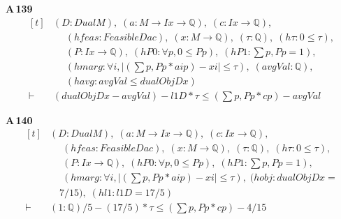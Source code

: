 \noindent\textbf{A\,139}\quad{}
{\footnotesize\[ \begin{aligned}[t]
&(\mathit{D} : \mathit{Dual} \mathit{M}),\; (\mathit{a} : \mathit{M} \to \mathit{Ix} \to \mathbb{Q} ),\; (\mathit{c} : \mathit{Ix} \to \mathbb{Q} ),\\
&\quad \; (\mathit{hfeas} : \mathit{Feasible} \mathit{D} \mathit{a} \mathit{c}),\; (\mathit{x} : \mathit{M} \to \mathbb{Q} ),\; (\tau : \mathbb{Q} ),\; (\mathit{hτ} : 0 \leq \tau ),\\
&\quad \; (\mathit{P} : \mathit{Ix} \to \mathbb{Q} ),\; (\mathit{hP0} : \forall \mathit{p}, 0 \leq \mathit{P} \mathit{p}),\; (\mathit{hP1} : \textstyle\sum \mathit{p}, \mathit{P} \mathit{p} = 1),\\
&\quad \; (\mathit{hmarg} : \forall \mathit{i}, |(\textstyle\sum \mathit{p}, \mathit{P} \mathit{p} * \mathit{a} \mathit{i} \mathit{p}) - \mathit{x} \mathit{i}| \leq \tau ),\; (\mathit{avgVal} : \mathbb{Q} ),\\
&\quad \; (\mathit{havg} : \mathit{avgVal} \leq \mathit{dualObj} \mathit{D} \mathit{x})\\
\vdash\;&(\mathit{dualObj} \mathit{D} \mathit{x} - \mathit{avgVal}) - \mathit{l1} \mathit{D} * \tau \leq (\textstyle\sum \mathit{p}, \mathit{P} \mathit{p} * \mathit{c} \mathit{p}) - \mathit{avgVal}
\end{aligned} \]}

\noindent\textbf{A\,140}\quad{}
{\footnotesize\[ \begin{aligned}[t]
&(\mathit{D} : \mathit{Dual} \mathit{M}),\; (\mathit{a} : \mathit{M} \to \mathit{Ix} \to \mathbb{Q} ),\; (\mathit{c} : \mathit{Ix} \to \mathbb{Q} ),\\
&\quad \; (\mathit{hfeas} : \mathit{Feasible} \mathit{D} \mathit{a} \mathit{c}),\; (\mathit{x} : \mathit{M} \to \mathbb{Q} ),\; (\tau : \mathbb{Q} ),\; (\mathit{hτ} : 0 \leq \tau ),\\
&\quad \; (\mathit{P} : \mathit{Ix} \to \mathbb{Q} ),\; (\mathit{hP0} : \forall \mathit{p}, 0 \leq \mathit{P} \mathit{p}),\; (\mathit{hP1} : \textstyle\sum \mathit{p}, \mathit{P} \mathit{p} = 1),\\
&\quad \; (\mathit{hmarg} : \forall \mathit{i}, |(\textstyle\sum \mathit{p}, \mathit{P} \mathit{p} * \mathit{a} \mathit{i} \mathit{p}) - \mathit{x} \mathit{i}| \leq \tau ),\; (\mathit{hobj} : \mathit{dualObj} \mathit{D} \mathit{x} =\\
&\quad 7/15),\; (\mathit{hl1} : \mathit{l1} \mathit{D} = 17/5)\\
\vdash\;&(1:\mathbb{Q} )/5 - (17/5) * \tau \leq (\textstyle\sum \mathit{p}, \mathit{P} \mathit{p} * \mathit{c} \mathit{p}) - 4/15
\end{aligned} \]}

